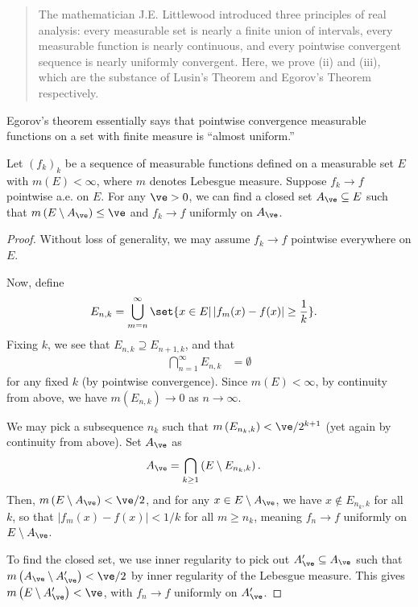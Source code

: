 \documentclass[10pt]{mypackage}
\begin{document}
\RaggedRight
\begin{abstract}
  \noindent The mathematician J.E. Littlewood introduced three principles of real analysis: every measurable set is nearly a finite union of intervals, every measurable function is nearly continuous, and every pointwise convergent sequence is nearly uniformly convergent. Here, we prove (ii) and (iii), which are the substance of Lusin's Theorem and Egorov's Theorem respectively.
\end{abstract}
Egorov's theorem essentially says that pointwise convergence measurable functions on a set with finite measure is ``almost uniform.''
\begin{theorem}
  Let $\left( f_k \right)_k$ be a sequence of measurable functions defined on a measurable set $E$ with $m(E) < \infty$, where $m$ denotes Lebesgue measure. Suppose $f_k\rightarrow f$ pointwise a.e. on $E$. For any $\ve > 0$, we can find a closed set $A_{\ve}\subseteq E$ such that $m\left( E\setminus A_{\ve} \right) \leq \ve$ and $f_k\rightarrow f$ uniformly on $A_{\ve}$.
\end{theorem}
\begin{proof}
  Without loss of generality, we may assume $f_k\rightarrow f$ pointwise everywhere on $E$.\newline

  Now, define
  \begin{align*}
    E_{n,k} &= \bigcup_{m=n}^{\infty}\set{x\in E | \left\vert f_m(x) - f(x) \right\vert \geq \frac{1}{k}}.
  \end{align*}
  Fixing $k$, we see that $E_{n,k}\supseteq E_{n+1,k}$, and that
  \begin{align*}
    \bigcap_{n=1}^{\infty}E_{n,k} &= \emptyset
  \end{align*}
  for any fixed $k$ (by pointwise convergence). Since $m(E) < \infty$, by continuity from above, we have $m\left( E_{n,k} \right)\rightarrow 0$ as $n\rightarrow\infty$.\newline

  We may pick a subsequence $n_k$ such that $m\left( E_{n_k,k} \right) < \ve/2^{k+1}$ (yet again by continuity from above). Set $A_{\ve}$ as
  \begin{align*}
    A_{\ve} &= \bigcap_{k\geq 1}\left( E\setminus E_{n_k,k} \right).
  \end{align*}
  Then, $m\left(E\setminus A_{\ve}\right) < \ve/2$, and for any $x\in E\setminus A_{\ve}$, we have $x\notin E_{n_k,k}$ for all $k$, so that $\left\vert f_m(x) - f(x) \right\vert < 1/k$ for all $m\geq n_k$, meaning $f_n\rightarrow f$ uniformly on $E\setminus A_{\ve}$.\newline

  To find the closed set, we use inner regularity to pick out $A'_{\ve}\subseteq A_{\ve}$ such that $m\left( A_{\ve}\setminus A'_{\ve} \right) < \ve/2$ by inner regularity of the Lebesgue measure. This gives $m\left( E\setminus A'_{\ve} \right) < \ve$, with $f_n\rightarrow f$ uniformly on $A'_{\ve}$.
\end{proof}
\end{document}
